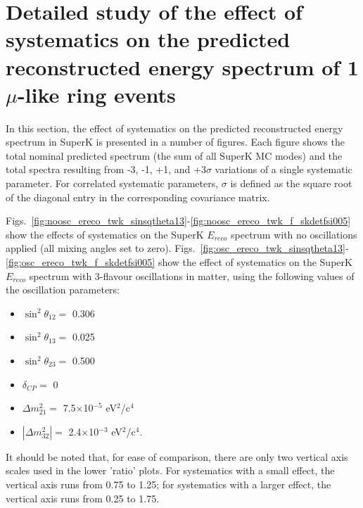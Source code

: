 \clearpage

\section{Detailed study of the effect of systematics on the predicted reconstructed energy spectrum of 1 $\mu$-like ring events}
\label{sec:spectrum_systematics}

In this section, the effect of systematics on the predicted reconstructed energy spectrum in SuperK is presented in a number of figures.
Each figure shows the total nominal predicted spectrum (the sum of all SuperK MC modes) and the total spectra resulting from -3, -1, +1, 
and +3$\sigma$ variations of a single systematic parameter.
For correlated systematic parameters, $\sigma$ is defined as the square root of the diagonal entry in the corresponding covariance matrix.

Figs.\ \ref{fig:noosc_ereco_twk_sinsqtheta13}-\ref{fig:noosc_ereco_twk_f_skdetfsi005} show the effects of systematics on the SuperK $E_{reco}$ 
spectrum with no oscillations applied (all mixing angles set to zero).
Figs.\ \ref{fig:osc_ereco_twk_sinsqtheta13}-\ref{fig:osc_ereco_twk_f_skdetfsi005} show the effect of systematics on the SuperK $E_{reco}$ spectrum 
with 3-flavour oscillations in matter, using the following values of the oscillation parameters:
\begin{itemize}
\item $\sin^2\theta_{12} = $ 0.306
\item $\sin^2\theta_{13} = $ 0.025
\item $\sin^2\theta_{23} = $ 0.500
\item $\delta_{CP} = $        0
\item $\Delta m^2_{21} = $    7.5$\times$10$^{-5}$ eV$^{2}$/c$^{4}$
\item $|\Delta m^2_{32}| = $  2.4$\times$10$^{-3}$ eV$^{2}$/c$^{4}$.
\end{itemize}
It should be noted that, for ease of comparison, there are only two vertical axis scales used in the lower 'ratio' plots. For systematics with a small 
effect, the vertical axis runs from 0.75 to 1.25; for systematics with a larger effect, the vertical axis runs from 0.25 to 1.75.








